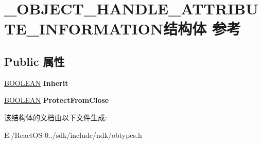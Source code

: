 \hypertarget{struct___o_b_j_e_c_t___h_a_n_d_l_e___a_t_t_r_i_b_u_t_e___i_n_f_o_r_m_a_t_i_o_n}{}\section{\+\_\+\+O\+B\+J\+E\+C\+T\+\_\+\+H\+A\+N\+D\+L\+E\+\_\+\+A\+T\+T\+R\+I\+B\+U\+T\+E\+\_\+\+I\+N\+F\+O\+R\+M\+A\+T\+I\+O\+N结构体 参考}
\label{struct___o_b_j_e_c_t___h_a_n_d_l_e___a_t_t_r_i_b_u_t_e___i_n_f_o_r_m_a_t_i_o_n}
\subsection*{Public 属性}
\begin{DoxyCompactItemize}
\item 
\mbox{\label{struct___o_b_j_e_c_t___h_a_n_d_l_e___a_t_t_r_i_b_u_t_e___i_n_f_o_r_m_a_t_i_o_n_a808cbaa680d84841a9d80a398bd89c94}} 
\hyperlink{_processor_bind_8h_a112e3146cb38b6ee95e64d85842e380a}{B\+O\+O\+L\+E\+AN} {\bfseries Inherit}
\item 
\mbox{\label{struct___o_b_j_e_c_t___h_a_n_d_l_e___a_t_t_r_i_b_u_t_e___i_n_f_o_r_m_a_t_i_o_n_a651bb6d6823b6b9b32d670ead736cdbd}} 
\hyperlink{_processor_bind_8h_a112e3146cb38b6ee95e64d85842e380a}{B\+O\+O\+L\+E\+AN} {\bfseries Protect\+From\+Close}
\end{DoxyCompactItemize}


该结构体的文档由以下文件生成\+:\begin{DoxyCompactItemize}
\item 
E\+:/\+React\+O\+S-\/0../sdk/include/ndk/obtypes.\+h\end{DoxyCompactItemize}
